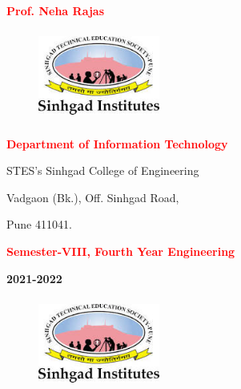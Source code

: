 \documentclass[12pt,a4paper]{report}
\begin{document}
\begin{center}
	\textbf{\Large{\textcolor{red}{Prof. Neha Rajas}}}
\end{center}





\begin{figure}[h]
\centering
\includegraphics[width=4cm,height=3cm]{stes.jpg}
\end{figure}

\begin{center}
	\textbf{\Large{\textcolor{red}{Department of Information Technology}}}
\end{center}

\begin{center} 
	\large {STES's Sinhgad College of Engineering}
\end{center}

\begin{center}
	Vadgaon (Bk.), Off. Sinhgad Road,
\end{center}

\begin{center}
	Pune 411041.\textbf{ }
\end{center}

\begin{center}
	\textbf{\Large{\textcolor{red}{Semester-VIII, Fourth Year Engineering}}}
\end{center}

\begin{center}
	\textbf{\large{2021-2022}}
\end{center}


\newpage

\begin{figure}[h]
\centering
\includegraphics[width=4cm,height=3cm]{stes.jpg}
\end{figure}
\end{document}
